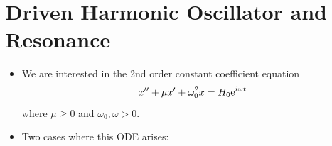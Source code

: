 \documentclass[../notes.tex]{subfiles}
\begin{document}
\section{Driven Harmonic Oscillator and Resonance}
\begin{itemize}
    \item {}We are interested in the 2nd order constant coefficient equation
    \begin{equation*}
        x''+\mu x'+\omega_0^2x = H_0\e[i\omega t]
    \end{equation*}
    where $\mu\geq 0$ and $\omega_0,\omega>0$.
    \item Two cases where this ODE arises:
    \begin{figure}[h!]
        \centering
        \footnotesize
        \begin{subfigure}[b]{0.35\linewidth}
            \centering
\end{subfigure}
\end{figure}
\end{itemize}
\end{document}
